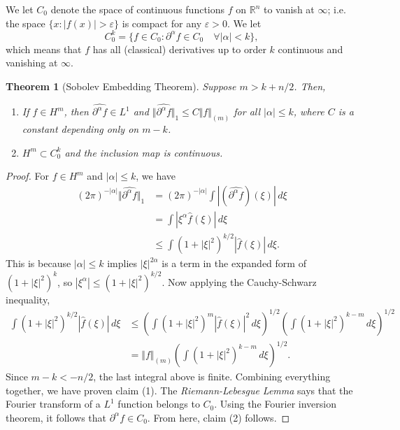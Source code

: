 \documentclass[12pt,letterpaper,reqno]{article}
\theoremstyle{plain}                              %
\newtheorem{thm}{Theorem}[section]
\theoremstyle{definition}                         %
\theoremstyle{remark}                             %
\numberwithin{equation}{section}
\newcommand{\R}{\mathbb{R}}                     %
\begin{document}
We let $C_0$ denote the space of continuous functions $f$ on $\R^n$ to vanish at $\infty$; i.e. the space $\{x: |f(x)|>\varepsilon\}$ is compact for any $\varepsilon>0$. We let
\[C_0^k = \{f\in C_0: \partial^\alpha f \in C_0 \quad\forall |\alpha|<k\},\]
which means that $f$ has all (classical) derivatives up to order $k$ continuous and vanishing at $\infty$.
\begin{thm}[Sobolev Embedding Theorem]
    Suppose $m>k+n/2$. Then,
    \begin{enumerate}
        \item[$(1)$] If $f\in H^m$, then $\widehat{\partial^\alpha f}\in L^1$ and $\Vert \widehat{\partial^\alpha f}\Vert_1 \le C \Vert f \Vert_{(m)}$ for all $|\alpha|\le k$, where $C$ is a constant depending only on $m-k$.
        \item[$(2)$] $H^m \subset C_0^k$ and the inclusion map is continuous.
    \end{enumerate}
\end{thm}
\begin{proof}
    For $f\in H^m$ and $|\alpha|\le k$, we have
    \begin{align*}
        (2\pi)^{-|\alpha|} \Vert \widehat{\partial^\alpha f}\Vert_1 &=(2\pi)^{-|\alpha|}\int |(\widehat{\partial^\alpha f})(\xi) |\, d\xi\\  &= \int |\xi^\alpha \widehat{f}(\xi)|\, d\xi \\
        &\le \int (1+|\xi|^2)^{k/2} |\widehat{f}(\xi)|\, d\xi.
    \end{align*}
    This is because $|\alpha| \le k$ implies $|\xi|^{2\alpha}$ is a term in the expanded form of $(1+|\xi|^2)^k$, so $|\xi^\alpha|\le (1+|\xi|^2)^{k/2}$. Now applying the Cauchy-Schwarz inequality,
    \begin{align*}
        \int (1+|\xi|^2)^{k/2} |\widehat{f}(\xi)| \, d\xi &\le \left( \int (1+|\xi|^2)^{m} |\widehat{f}(\xi)|^2\, d\xi\right)^{1/2}\left( \int (1+|\xi|^2)^{k-m}\, d\xi\right)^{1/2}\\
        &= \Vert f \Vert_{(m)}\left( \int (1+|\xi|^2)^{k-m}\, d\xi\right)^{1/2}.
    \end{align*}
    Since $m-k< - n/2$, the last integral above is finite. Combining everything together, we have proven claim (1). The \textit{Riemann-Lebesgue Lemma} says that the Fourier transform of a $L^1$ function belongs to $C_0$. Using the Fourier inversion theorem, it follows that $\partial^\alpha f\in C_0$. From here, claim (2) follows.  
\end{proof}
\end{document}
